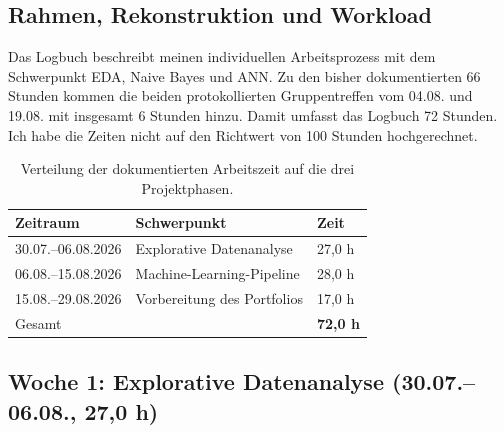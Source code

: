 
\subsection{Rahmen, Rekonstruktion und Workload}
\label{log:rahmen}

Das Logbuch beschreibt meinen individuellen Arbeitsprozess mit dem Schwerpunkt EDA, Naive
Bayes und ANN. Zu den bisher dokumentierten 66 Stunden kommen die beiden protokollierten
Gruppentreffen vom 04.08. und 19.08. mit insgesamt 6 Stunden hinzu. Damit umfasst das
Logbuch 72 Stunden. Ich habe die Zeiten nicht auf den Richtwert von 100 Stunden hochgerechnet.

\begin{table}[htbp]
  \centering
  \caption{Verteilung der dokumentierten Arbeitszeit auf die drei Projektphasen.}
  \label{tab:log-workload}
  \begin{tabular}{lll}
    \toprule
    \textbf{Zeitraum} & \textbf{Schwerpunkt} & \textbf{Zeit} \\
    \midrule
    30.07.--06.08.2026 & Explorative Datenanalyse & 27,0 h \\
    06.08.--15.08.2026 & Machine-Learning-Pipeline & 28,0 h \\
    15.08.--29.08.2026 & Vorbereitung des Portfolios & 17,0 h \\
    \midrule
    Gesamt & & \textbf{72,0 h} \\
    \bottomrule
  \end{tabular}
\end{table}

\subsection{Woche 1: Explorative Datenanalyse (30.07.--06.08., 27,0 h)}

\label{log:3007}

